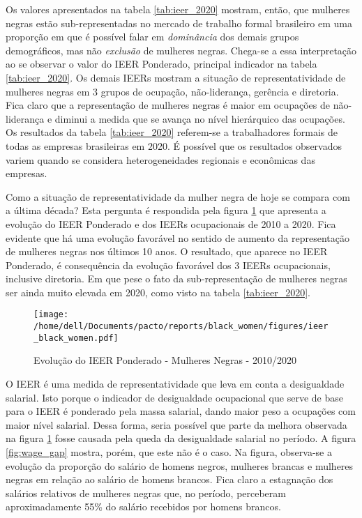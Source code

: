 \documentclass[12pt]{article}
\begin{document}
\par Os valores apresentados na tabela \ref{tab:ieer_2020} mostram, então, que mulheres negras estão sub-representadas no mercado de trabalho formal brasileiro em uma proporção em que é possível falar em \textit{dominância} dos demais grupos demográficos, mas não \textit{exclusão} de mulheres negras. Chega-se a essa interpretação ao se observar o valor do IEER Ponderado, principal indicador na tabela \ref{tab:ieer_2020}. Os demais IEERs mostram a situação de representatividade de mulheres negras em 3 grupos de ocupação, não-liderança, gerência e diretoria. Fica claro que a representação de mulheres negras é maior em ocupações de não-liderança e diminui a medida que se avança no nível hierárquico das ocupações. Os resultados da tabela \ref{tab:ieer_2020} referem-se a trabalhadores formais de todas as empresas brasileiras em 2020. É possível que os resultados observados variem quando se considera heterogeneidades regionais e econômicas das empresas.



\par Como a situação de representatividade da mulher negra de hoje se compara com a última década? Esta pergunta é respondida pela figura \ref{fig:ieer_evolution} que apresenta a evolução do IEER Ponderado e dos IEERs ocupacionais de 2010 a 2020. Fica evidente que há uma evolução favorável no sentido de aumento da representação de mulheres negras nos últimos 10 anos. O resultado, que aparece no IEER Ponderado, é consequência da evolução favorável dos 3 IEERs ocupacionais, inclusive diretoria. Em que pese o fato da sub-representação de mulheres negras ser ainda muito elevada em 2020, como visto na tabela \ref{tab:ieer_2020}.

\begin{figure}[H]
    \centering
    \caption{Evolução do IEER Ponderado - Mulheres Negras - 2010/2020}
        \texttt{[image: /home/dell/Documents/pacto/reports/black\_women/figures/ieer\_black\_women.pdf]}
    \label{fig:ieer_evolution}
\end{figure}

\par O IEER é uma medida de representatividade que leva em conta a desigualdade salarial. Isto porque o indicador de desigualdade ocupacional que serve de base para o IEER é ponderado pela massa salarial, dando maior peso a ocupações com maior nível salarial. Dessa forma, seria possível que parte da melhora observada na figura \ref{fig:ieer_evolution} fosse causada pela queda da desigualdade salarial no período. A figura \ref{fig:wage_gap} mostra, porém, que este não é o caso. Na figura, observa-se a evolução da proporção do salário de homens negros, mulheres brancas e mulheres negras em relação ao salário de homens brancos. Fica claro a estagnação dos salários relativos de mulheres negras que, no período, perceberam aproximadamente 55\% do salário recebidos por homens brancos.
\end{document}
